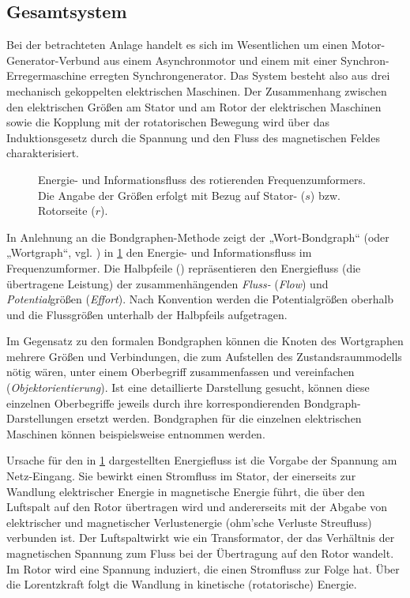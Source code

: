 \subsection{Gesamtsystem}\label{sec:gesamtsystem}

Bei der betrachteten Anlage handelt es sich im Wesentlichen um einen Motor-Generator-Verbund aus einem Asynchronmotor und einem mit einer Synchron-Erregermaschine erregten Synchrongenerator. Das System besteht also aus drei mechanisch gekoppelten elektrischen Maschinen. Der Zusammenhang zwischen den elektrischen Größen am Stator und am Rotor der elektrischen Maschinen sowie die Kopplung mit der rotatorischen Bewegung wird über das Induktionsgesetz durch die Spannung und den Fluss des magnetischen Feldes charakterisiert.

\begin{figure}
    \centering
    
    \caption{Energie- und Informationsfluss des rotierenden Frequenzumformers. Die Angabe der Größen erfolgt mit Bezug auf Stator- ($s$) bzw. Rotorseite ($r$).}
    \label{fig:Wirkungsgraph}
\end{figure}

In Anlehnung an die Bondgraphen-Methode zeigt der „Wort-Bondgraph“ (oder „Wortgraph“, vgl. \cite[S.~10]{roddeckBondgraphenModellbildungUnd2019}) in \cref{fig:Wirkungsgraph} den Energie- und Informationsfluss im Frequenzumformer. Die Halbpfeile (\bond) repräsentieren den Energiefluss (die übertragene Leistung) der zusammenhängenden \emph{Fluss-} (\emph{Flow}) und \emph{Potential}größen (\emph{Effort}). Nach Konvention werden die Potentialgrößen oberhalb und die Flussgrößen unterhalb der Halbpfeils aufgetragen. 

Im Gegensatz zu den formalen Bondgraphen können die Knoten des Wortgraphen mehrere Größen und Verbindungen, die zum Aufstellen des Zustandsraummodells nötig wären, unter einem Oberbegriff zusammenfassen und vereinfachen (\emph{Objektorientierung}). Ist eine detaillierte Darstellung gesucht, können diese einzelnen Oberbegriffe jeweils durch ihre korrespondierenden Bondgraph-Darstellungen ersetzt werden. Bondgraphen für die einzelnen elektrischen Maschinen können beispielsweise \cite[S.~269~ff.]{borutzkyBondGraphModelling2011} entnommen werden.

Ursache für den in \cref{fig:Wirkungsgraph} dargestellten Energiefluss ist die Vorgabe der Spannung am Netz-Eingang. Sie bewirkt einen Stromfluss im Stator, der einerseits zur Wandlung elektrischer Energie in magnetische Energie führt, die über den Luftspalt auf den Rotor übertragen wird und andererseits mit der Abgabe von elektrischer und magnetischer Verlustenergie (ohm'sche Verluste Streufluss) verbunden ist. Der Luftspaltwirkt wie ein Transformator, der das Verhältnis der magnetischen Spannung zum Fluss bei der Übertragung auf den Rotor  wandelt. Im Rotor wird eine Spannung induziert, die einen Stromfluss zur Folge hat. Über die Lorentzkraft folgt die Wandlung in kinetische (rotatorische) Energie.

